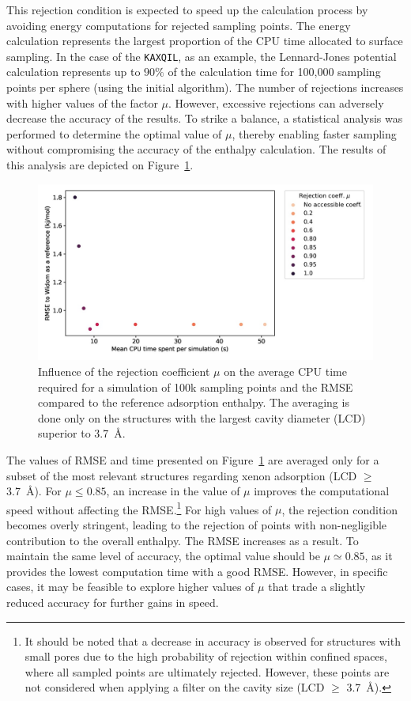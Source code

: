 \documentclass[main]{subfiles}
\begin{document}
This rejection condition is expected to speed up the calculation process by avoiding energy computations for rejected sampling points. The energy calculation represents the largest proportion of the CPU time allocated to surface sampling. In the case of the \texttt{KAXQIL}\autocite{Banerjee_2012}, as an example, the Lennard-Jones potential calculation represents up to $90\%$ of the calculation time for 100,000 sampling points per sphere (using the initial algorithm). The number of rejections increases with higher values of the factor $\mu$. However, excessive rejections can adversely decrease the accuracy of the results. To strike a balance, a statistical analysis was performed to determine the optimal value of $\mu$, thereby enabling faster sampling without compromising the accuracy of the enthalpy calculation. The results of this analysis are depicted on Figure~\ref{fgr:rejection}.

\begin{figure}[ht]
\centering
  \includegraphics[width=0.7\linewidth]{figures/3-fastsim/rejection_coeff_optimisation.jpg}
  \caption{Influence of the rejection coefficient $\mu$ on the average CPU time required for a simulation of 100k sampling points and the RMSE compared to the reference adsorption enthalpy. The averaging is done only on the structures with the largest cavity diameter (LCD) superior to \SI{3.7}{\angstrom}. }\label{fgr:rejection}
\end{figure}

The values of RMSE and time presented on Figure~\ref{fgr:rejection} are averaged only for a subset of the most relevant structures regarding xenon adsorption (LCD $\geq$ \SI{3.7}{\angstrom}). For $\mu\leq 0.85$, an increase in the value of $\mu$ improves the computational speed without affecting the RMSE.\footnote{It should be noted that a decrease in accuracy is observed for structures with small pores due to the high probability of rejection within confined spaces, where all sampled points are ultimately rejected. However, these points are not considered when applying a filter on the cavity size (LCD $\geq$ \SI{3.7}{\angstrom}).} For high values of $\mu$, the rejection condition becomes overly stringent, leading to the rejection of points with non-negligible contribution to the overall enthalpy. The RMSE increases as a result. To maintain the same level of accuracy, the optimal value should be $\mu \simeq 0.85$, as it provides the lowest computation time with a good RMSE. However, in specific cases, it may be feasible to explore higher values of $\mu$ that trade a slightly reduced accuracy for further gains in speed.
\end{document}
